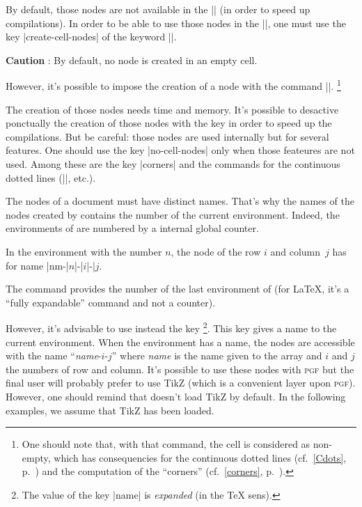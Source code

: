 \documentclass[dvipsnames]{article}
\begin{document}
\smallskip
By default, those nodes are not available in the |\CodeBefore| (in order to speed up
compilations). In order to be able to use those nodes in the |\CodeBefore|, one must
use the key |create-cell-nodes| of the keyword |\CodeBefore|.


\smallskip
\textbf{Caution} : By default, no node is created in an empty cell.

\smallskip
However, it's possible to impose the creation of a node with the command
|\NotEmpty|. \footnote{One should note that, with that command, the cell is
considered as non-empty, which has consequencies for the continuous dotted
lines (cf.~\ref{Cdots}, p.~\pageref{Cdots}) and the computation of the ``corners''
(cf.~\ref{corners}, p.~\pageref{corners}).}

\medskip
The creation of those nodes needs time and memory. It's possible to desactive
ponctually the creation of those nodes with the key 
in order to speed up the compilations. But be careful: those nodes are used
internally but  for several features. One should use the key
|no-cell-nodes| only when those feateures are not used. Among these are the key
|corners| and the commands for the continuous dotted lines (|\Cdots|, etc.).

\medskip
The nodes of a document must have distinct names. That's why the names of the
nodes created by  contains the number of the current
environment. Indeed, the environments of  are numbered by a
internal global counter. 

\smallskip
In the environment with the number $n$, the node of the row $i$ and
column~$j$ has for name |nm-|$n$|-|$i$|-|$j$. 

\smallskip
The command  provides the number of the
last environment of  (for LaTeX, it's a ``fully expandable''
command and not a counter).

\smallskip
{}
However, it's advisable to use instead the key \footnote{The value of the
key |name| is \emph{expanded} (in the TeX sens).}. This key
gives a name to the current environment. When the environment has a name, the
nodes are accessible with the name ``\textsl{name}-$i$-$j$'' where \textsl{name}
is the name given to the array and $i$ and $j$ the numbers of row and column.
It's possible to use these nodes with \textsc{pgf} but the final user will
probably prefer to use TikZ (which is a convenient layer upon \textsc{pgf}).
However, one should remind that  doesn't load TikZ by default.
In the following examples, we assume that TikZ has been loaded.
\end{document}
